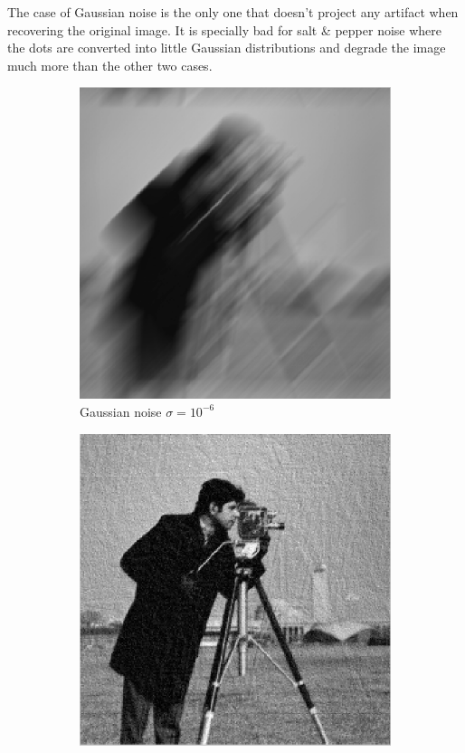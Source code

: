 \documentclass[a4paper, 10pt, conference] {article}
\begin{document}
The case of Gaussian noise is the only one that doesn't project any artifact when recovering the original image. It is specially bad for salt \& pepper noise where the dots are converted into little Gaussian distributions and degrade the image much more than the other two cases.

\begin{figure}[H]
	\centering
	\begin{subfigure}{0.49\textwidth} 
		\centering						
		\includegraphics[scale=0.48]{motion/noisy/gaussian_000001.PNG}
		\caption{Gaussian noise $\sigma = 10^{-6}$}
	\end{subfigure}
	\begin{subfigure}{0.49\textwidth} 
		\centering						
		\includegraphics[scale=0.48]{motion/noisy/recovered_gaussian_000001_lam7500.PNG}

\end{subfigure}
\end{figure}
\end{document}

